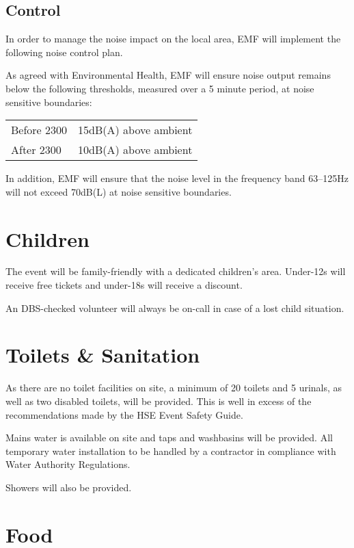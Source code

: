 \subsection{Control}

In order to manage the noise impact on the local area, EMF will implement the following noise control plan.

As agreed with Environmental Health, EMF will ensure noise output remains below the following thresholds,
measured over a 5 minute period, at noise sensitive boundaries:

\begin{tabular}{l l}
  Before 2300 & 15dB(A) above ambient\\
  After 2300 & 10dB(A) above ambient\\
\end{tabular}

In addition, EMF will ensure that the noise level in the frequency band 63--125Hz will not exceed 70dB(L)
at noise sensitive boundaries.

\section{Children}

The event will be family-friendly with a dedicated children's area. Under-12s will receive free tickets
and under-18s will receive a discount.

An DBS-checked volunteer will always be on-call in case of a lost child situation.

\section{Toilets \& Sanitation}

As there are no toilet facilities on site, a minimum of 20 toilets and 5 urinals, as well as two disabled toilets,
will be provided. This is well in excess of the recommendations made by the HSE Event Safety Guide.

Mains water is available on site and taps and washbasins will be provided. All temporary water installation to be
handled by a contractor in compliance with Water Authority Regulations.

Showers will also be provided.

\section{Food}

